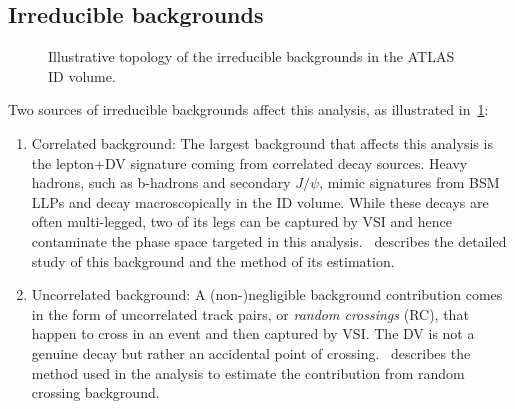 \subsection{Irreducible backgrounds}

\begin{figure}[!ht]
    \centering
     \caption{Illustrative topology of the irreducible backgrounds in the ATLAS ID volume.}
     \label{fig:bkg_irreducible}
\end{figure}

Two sources of irreducible backgrounds affect this analysis, as illustrated in~\cref{fig:bkg_irreducible}:
\begin{enumerate}
    \item Correlated background: The largest background that affects this analysis is the lepton+DV signature coming from correlated decay sources. Heavy hadrons, such as b-hadrons and secondary $J/\psi$, mimic signatures from BSM LLPs and decay macroscopically in the ID volume. While these decays are often multi-legged, two of its legs can be captured by VSI and hence contaminate the phase space targeted in this analysis.~ describes the detailed study of this background and the method of its estimation.

    \item Uncorrelated background: A (non-)negligible background contribution comes in the form of uncorrelated track pairs, or \textit{random crossings} (RC), that happen to cross in an event and then captured by VSI. The DV is not a genuine decay but rather an accidental point of crossing.~ describes the method used in the analysis to estimate the contribution from random crossing background.
\end{enumerate}

